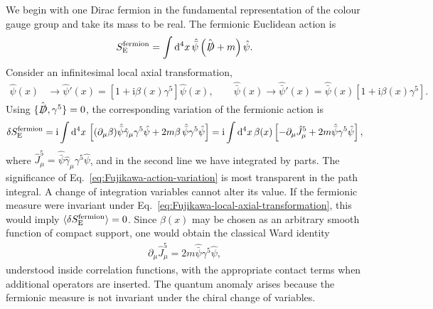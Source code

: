 \documentclass[review]{elsarticle}
\numberwithin{equation}{section}
\numberwithin{table}{section}
\numberwithin{figure}{section}
\def\d{\mathrm{d}}
\def\i{\mathrm{i}}
\begin{document}
We begin with one Dirac fermion in the fundamental representation of the colour gauge group and take its mass to be real. The fermionic Euclidean action is
\begin{align}
    S_{\rm E}^{\rm fermion}
    =
    \int \d^4x\,
    \hat{\bar\psi}
    \left(
        \hat{\slashed{D}}+m
    \right)
    \hat\psi .
    \label{eq:Fujikawa-Euclidean-action}
\end{align}
Consider an infinitesimal local axial transformation,
\begin{align}
    \hat\psi(x)
    &\rightarrow
    \hat\psi'(x)
    =
    \left[1+\i\beta(x)\gamma^5\right]\hat\psi(x),
    \qquad
    \hat{\bar\psi}(x)
    \rightarrow
    \hat{\bar\psi}'(x)
    =
    \hat{\bar\psi}(x)
    \left[1+\i\beta(x)\gamma^5\right].
    \label{eq:Fujikawa-local-axial-transformation}
\end{align}
Using $\{\hat{\slashed{D}},\gamma^5\}=0$, the corresponding variation of the fermionic action is
\begin{align}
    \delta S_{\rm E}^{\rm fermion}
    =
    \i\int \d^4x\,\left[(\partial_\mu\beta)\hat{\bar\psi}\hat\gamma_\mu\gamma^5\hat\psi + 2m\beta\, \hat{\bar\psi}\gamma^5\hat\psi\right]
    =
    \i\int \d^4x\,
    \beta(x)
    \left[-\partial_\mu\hat J_\mu^5 + 2m\hat{\bar\psi}\gamma^5\hat\psi\right],
    \label{eq:Fujikawa-action-variation}
\end{align}
where $\hat J_\mu^5=\hat{\bar\psi}\hat\gamma_\mu\gamma^5\hat\psi$, and in the second line we have integrated by parts. The significance of Eq.~\eqref{eq:Fujikawa-action-variation} is most transparent in the path integral. A change of integration variables cannot alter its value. If the fermionic measure were invariant under Eq.~\eqref{eq:Fujikawa-local-axial-transformation}, this would imply $\langle\delta S_{\rm E}^{\rm fermion}\rangle=0$. Since $\beta(x)$ may be chosen as an arbitrary smooth function of compact support, one would obtain the classical Ward identity
\begin{align}
    \partial_\mu\hat J_\mu^5 = 2m\hat{\bar\psi}\gamma^5\hat\psi,
\end{align}
understood inside correlation functions, with the appropriate contact terms when additional operators are inserted. The quantum anomaly arises because the fermionic measure is not invariant under the chiral change of variables.
\end{document}
